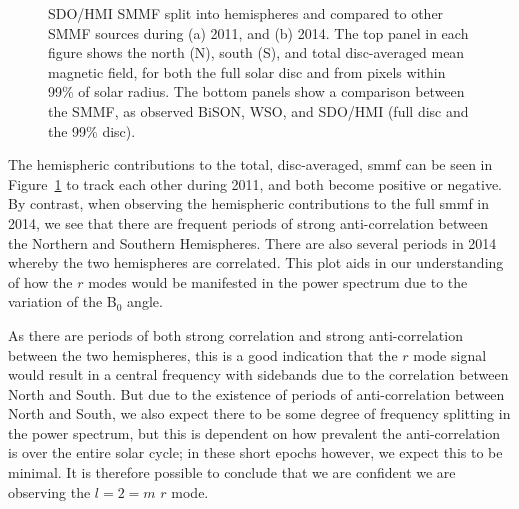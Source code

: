 \begin{figure}[!ht]
	\centering
	\qquad
	\caption{SDO/HMI SMMF split into hemispheres and compared to other SMMF sources during (a) 2011, and (b) 2014. The top panel in each figure shows the north (N), south (S), and total disc-averaged mean magnetic field, for both the full solar disc and from pixels within 99\% of solar radius. The bottom panels show a comparison between the SMMF, as observed BiSON, WSO, and SDO/HMI (full disc and the 99\% disc).}  \label{fig:HMI_MF}
\end{figure}


The hemispheric contributions to the total, disc-averaged, \gls{smmf} can be seen in Figure~\ref{fig:HMI_MF} to track each other during 2011, and both become positive or negative. By contrast, when observing the hemispheric contributions to the full \gls{smmf} in 2014, we see that there are frequent periods of strong anti-correlation between the Northern and Southern Hemispheres. There are also several periods in 2014 whereby the two hemispheres are correlated. This plot aids in our understanding of how the $r$ modes would be manifested in the power spectrum due to the variation of the B$_0$ angle. 

As there are periods of both strong correlation and strong anti-correlation between the two hemispheres, this is a good indication that the $r$ mode signal would result in a central frequency with sidebands due to the correlation between North and South. But due to the existence of periods of anti-correlation between North and South, we also expect there to be some degree of frequency splitting in the power spectrum, but this is dependent on how prevalent the anti-correlation is over the entire solar cycle; in these short epochs however, we expect this to be minimal. It is therefore possible to conclude that we are confident we are observing the $l=2=m$ $r$ mode.

